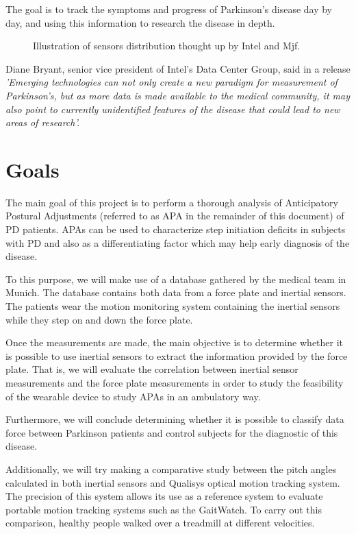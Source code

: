 The goal is to track the symptoms and progress of Parkinson’s disease day by day, and using this information to research the disease in depth.

\begin{figure}[H]
	\centering
	\caption{Illustration of sensors distribution thought up by Intel and Mjf\cite{IntelAndMjf}.}
	\label{fig:IntelAndMjf}
\end{figure}

Diane Bryant, senior vice president of Intel's Data Center Group, said in a release \cite{IntelAndMjf}
\textit{'Emerging technologies can not only create a new paradigm for measurement of Parkinson's, but as more data is made available to the medical community, it may also point to currently unidentified features of the disease that could lead to new areas of research'.}

\section{Goals}

The main goal of this project is to perform a thorough analysis of Anticipatory Postural Adjustments (referred to as APA in the remainder of this document) of PD patients. APAs can be used to characterize step initiation deficits in subjects with PD and also as a differentiating factor which may help early diagnosis of the disease.

To this purpose, we will make use of a database gathered by the medical team in Munich. The database contains both data from a force plate and inertial sensors. The patients wear the motion monitoring system containing the inertial sensors while they step on and down the force plate.

Once the measurements are made, the main objective is to determine whether it is possible to use inertial sensors to extract the information provided by the force plate. That is, we will evaluate the correlation between inertial sensor measurements and the force plate measurements in order to study the feasibility of the wearable device to study APAs in an ambulatory way. 

Furthermore, we will conclude determining whether it is possible to classify data force between Parkinson patients and control subjects for the diagnostic of this disease.

Additionally, we will try making a comparative study between the pitch angles calculated in both inertial sensors and Qualisys optical motion tracking system. The precision of this system allows its use as a reference system to evaluate portable
motion tracking systems such as the GaitWatch. To carry out this comparison, healthy people walked over a treadmill at different velocities.

